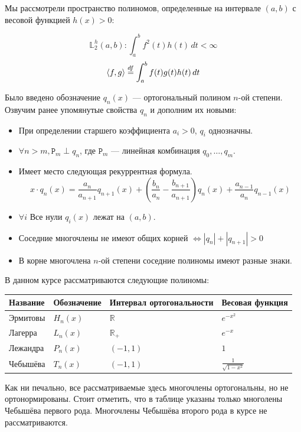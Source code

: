 \documentclass[12pt]{article}
\begin{document}

		Мы рассмотрели пространство полиномов, определенные на интервале $(a, b)$ с весовой функцией $h(x) > 0$:

		$$\mathbb{L}_2^h (a, b): \int_a^b f^2(t) h(t) \,dt < \infty$$
		$$\left\langle f, g \right\rangle \overset{df}{=} \int_a^b f(t) g(t) h(t) \,dt$$
	
		Было введено обозначение $q_n(x)$ --- ортогональный полином $n$-ой степени. Озвучим ранее упомянутые
		свойства $q_n$ и дополним их новыми:

		\begin{itemize}
			\item При определении старшего коэффициента $a_i > 0$, $q_i$ однозначны.
			\item $\forall n > m, \mathtt{P}_m \perp q_n$, где $\mathtt{P}_m$ --- линейная комбинация $q_0, \dots , q_m$.
			\item Имеет место следующая рекуррентная формула.
			$$x \cdot q_n(x) = 
			\frac{a_n}{a_{n+1}} q_{n+1}(x) + (\frac{b_n}{a_n} - \frac{b_{n+1}}{a_{n+1}}) q_n(x) + \frac{a_{n-1}}{a_n} q_{n-1}(x)$$
			\item $\forall i$ Все нули $q_i(x)$ лежат на $(a, b)$.
			\item Соседние многочлены не имеют общих корней $\Leftrightarrow |q_n| + |q_{n+1}| > 0$
			\item В корне многочлена $n$-ой степени соседние полиномы имеют разные знаки.
		\end{itemize}

		В данном курсе рассматриваются следующие полиномы:

		\begin{table}[!th]
			\begin{tabular}{|l|l|l|l|}
				\hline
				Название & Обозначение & Интервал ортогональности & Весовая функция \\
				\hline
				Эрмитовы & $H_n(x)$ & $\mathbb{R}$ & $e^{-x^2}$ \\
				Лагерра  & $L_n(x)$ & $\mathbb{R}_+$ & $e^{-x}$ \\
				Лежандра & $P_n(x)$ & $(-1, 1)$ & $1$ \\
				Чебышёва & $T_n(x)$ & $(-1, 1)$ & $\frac{1}{\sqrt{1-x^2}}$ \\
				\hline
			\end{tabular}
		\end{table}
	
		Как ни печально, все рассматриваемые здесь многочлены ортогональны, но не ортонормированы.
		Стоит отметить, что в таблице указаны только многолены Чебышёва первого рода. Многочлены Чебышёва
		второго рода в курсе не рассматриваются.
	
\end{document}

